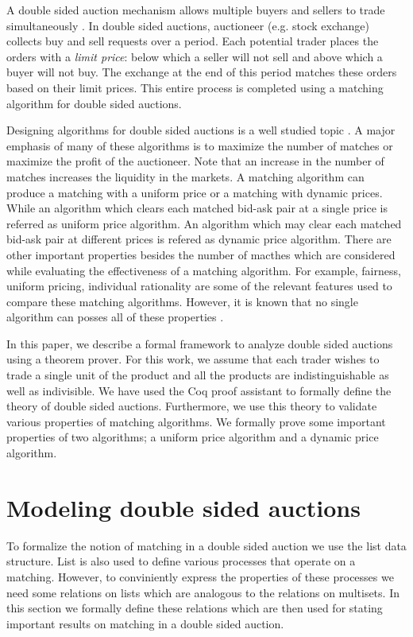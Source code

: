 \documentclass[a4paper,UKenglish,cleveref, autoref]{lipics-v2019}
\begin{document}
A double sided auction mechanism allows multiple buyers and sellers to trade simultaneously \cite{friedman}. In double sided auctions,  auctioneer (e.g. stock exchange) collects buy and sell requests over a period. Each potential trader places the orders with a \emph{limit price}: below which a seller will not sell and above which a buyer will not buy. The exchange at the end of this period matches these orders based on their limit prices. This entire process is completed using a matching algorithm for double sided auctions.  

Designing algorithms for double sided auctions is a well studied topic \cite{mcafee1992, WurmanWW98,NiuP13, ZhaoZKP10}.  A major emphasis of many of these algorithms is to maximize the number of matches or maximize the profit of the auctioneer. Note that an increase in the number of matches increases the liquidity in the markets. A matching algorithm can produce a matching with a uniform price or a matching with dynamic prices. While an algorithm which clears each matched bid-ask pair at a single price is referred as uniform price algorithm.  An algorithm which may clear each matched bid-ask pair at different prices is refered as  dynamic price algorithm. There are other important properties besides the number of macthes which are considered while evaluating the effectiveness of a matching algorithm. For example, fairness, uniform pricing, individual rationality are some of the relevant features used to compare these matching algorithms. However, it is known that no single algorithm can posses all of these properties \cite{WurmanWW98,mcafee1992}. 

In this paper, we describe a formal framework to analyze double sided auctions using a theorem prover.  For this work, we assume that each trader wishes to trade a single unit of the product and all the products are indistinguishable as well as indivisible. We have used the Coq proof assistant to formally  define the theory of double sided auctions.  Furthermore, we use this theory to validate various properties of matching algorithms. We formally prove some important properties of two algorithms; a uniform price algorithm and a dynamic price algorithm. 

\section{Modeling double sided auctions}
To formalize the notion of matching in a double sided auction we use the list data structure.  List is also used to define various processes that operate on  a matching. However, to conviniently express the properties of these processes we need some  relations on lists which are analogous to the relations on multisets. In this section we formally define these relations which are then used for stating important results on matching in a double sided auction.
\end{document}
